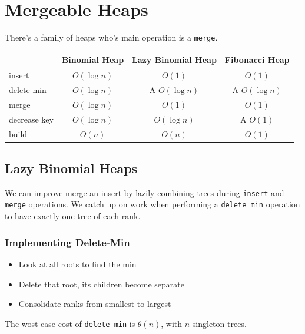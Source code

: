             \section{Mergeable Heaps} %
            \label{sec:mergeable_heaps}
                There's a family of heaps who's main operation is a \verb|merge|.

                \begin{table}[h]
                    \centering
                    \begin{tabular}{ l | c | c | c }
                        & Binomial Heap & Lazy Binomial Heap & Fibonacci Heap \\ \hline \hline

                        insert          & $O(\log n)$   & {\color{BlueGreen}$O(1)$}    & $O(1)$            \\ \hline
                        delete min      & $O(\log n)$   & A $O(\log n)$     & A $O(\log n)$     \\ \hline
                        merge           & $O(\log n)$   & {\color{BlueGreen}$O(1)$}    & $O(1)$            \\ \hline
                        decrease key    & $O(\log n)$   & $O(\log n)$       & {\color{BlueGreen}A $O(1)$}  \\ \hline
                        build           & $O(n)$        & $O(n)$            & $O(1)$            \\
                    \end{tabular}
                \end{table}

                \subsection{Lazy Binomial Heaps} %
                \label{sub:lazy_binomial_heaps}
                    We can improve merge an insert by lazily combining trees during \verb|insert| and \verb|merge| operations.
                    We catch up on work when performing a \verb|delete min| operation to have exactly one tree of each rank.

                    \subsubsection{Implementing Delete-Min} %
                    \label{ssub:implementing_delete_min}
                        \begin{itemize}
                            \item Look at all roots to find the min
                            \item Delete that root, its children become separate
                            \item Consolidate ranks from smallest to largest
                        \end{itemize}
                        The wost case cost of \verb|delete min| is $\theta(n)$, with $n$ singleton trees.
